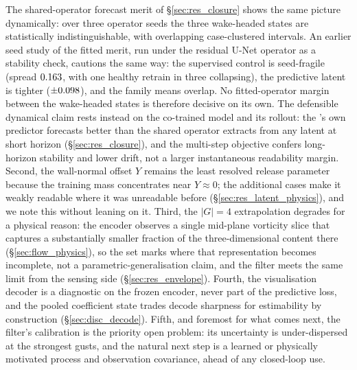 The shared-operator forecast merit of \S\ref{sec:res_closure} shows the same picture dynamically: over three operator seeds the three wake-headed states are statistically indistinguishable, with overlapping case-clustered intervals. An earlier seed study of the fitted merit, run under the residual U-Net operator as a stability check, cautions the same way: the supervised control is seed-fragile (spread $0.163$, with one healthy retrain in three collapsing), the predictive latent is tighter ($\pm 0.098$), and the family means overlap. No fitted-operator margin between the wake-headed states is therefore decisive on its own. The defensible dynamical claim rests instead on the co-trained model and its rollout: the \PredState's own predictor forecasts better than the shared operator extracts from any latent at short horizon (\S\ref{sec:res_closure}), and the multi-step objective confers long-horizon stability and lower drift, not a larger instantaneous readability margin. Second, the wall-normal offset $Y$ remains the least resolved release parameter because the training mass concentrates near $Y \approx 0$; the additional cases make it weakly readable where it was unreadable before (\S\ref{sec:res_latent_physics}), and we note this without leaning on it. Third, the $|G| = 4$ extrapolation degrades for a physical reason: the encoder observes a single mid-plane vorticity slice that captures a substantially smaller fraction of the three-dimensional content there (\S\ref{sec:flow_physics}), so the \BoundarySplit{} set marks where that representation becomes incomplete, not a parametric-generalisation claim, and the filter meets the same limit from the sensing side (\S\ref{sec:res_envelope}). Fourth, the visualisation decoder is a diagnostic on the frozen encoder, never part of the predictive loss, and the pooled coefficient state trades decode sharpness for estimability by construction (\S\ref{sec:disc_decode}). Fifth, and foremost for what comes next, the filter's calibration is the priority open problem: its uncertainty is under-dispersed at the strongest gusts, and the natural next step is a learned or physically motivated process and observation covariance, ahead of any closed-loop use.\re

